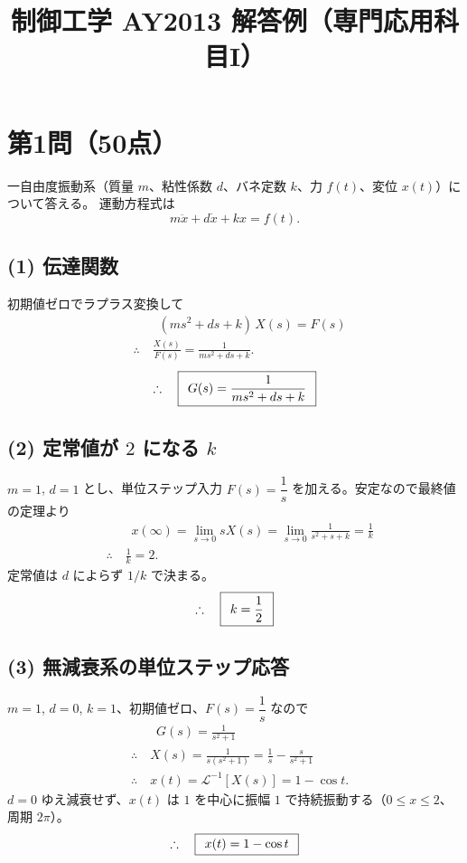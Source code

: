 \documentclass[11pt,a4paper]{article}
\title{制御工学 AY2013 解答例（専門応用科目I）}
\author{}
\date{}
\begin{document}
\maketitle

\section*{第1問（50点）}

一自由度振動系（質量 $m$、粘性係数 $d$、バネ定数 $k$、力 $f(t)$、変位 $x(t)$）について答える。
運動方程式は
\[
  m\ddot{x}+d\dot{x}+kx=f(t).
\]

\subsection*{(1) 伝達関数}
初期値ゼロでラプラス変換して
\begin{align*}
  &\qquad (ms^2+ds+k)\,X(s)=F(s)\\
  &\therefore\quad \frac{X(s)}{F(s)}=\frac{1}{ms^2+ds+k}.
\end{align*}
\[
  \therefore\quad \boxed{\,\;G(s)=\dfrac{1}{ms^2+ds+k}\;\,}
\]

\subsection*{(2) 定常値が $2$ になる $k$}
$m=1$, $d=1$ とし、単位ステップ入力 $F(s)=\dfrac1s$ を加える。安定なので最終値の定理より
\begin{align*}
  &\qquad x(\infty)=\lim_{s\to0}sX(s)=\lim_{s\to0}\frac{1}{s^2+s+k}=\frac{1}{k}\\
  &\therefore\quad \frac{1}{k}=2.
\end{align*}
定常値は $d$ によらず $1/k$ で決まる。
\[
  \therefore\quad \boxed{\,\;k=\dfrac12\;\,}
\]

\subsection*{(3) 無減衰系の単位ステップ応答}
$m=1$, $d=0$, $k=1$、初期値ゼロ、$F(s)=\dfrac1s$ なので
\begin{align*}
  &\qquad G(s)=\frac{1}{s^2+1}\\
  &\therefore\quad X(s)=\frac{1}{s(s^2+1)}=\frac1s-\frac{s}{s^2+1}\\
  &\therefore\quad x(t)=\mathcal{L}^{-1}[X(s)]=1-\cos t.
\end{align*}
$d=0$ ゆえ減衰せず、$x(t)$ は $1$ を中心に振幅 $1$ で持続振動する（$0\le x\le 2$、周期 $2\pi$）。
\[
  \therefore\quad \boxed{\,\;x(t)=1-\cos t\;\,}
\]
\end{document}
